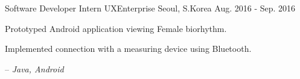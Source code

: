 \begin{cventries}
  \cventry
    {Software Developer Intern} %
    {UXEnterprise} %
    {Seoul, S.Korea} %
    {Aug. 2016 - Sep. 2016} %
    {
      \begin{cvitems} %
        \item {Prototyped Android application viewing Female biorhythm.}
        \item {Implemented connection with a measuring device using Bluetooth.}
        \item[--] \textit{Java, Android}
      \end{cvitems}
    }

\end{cventries}
